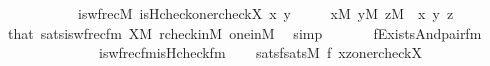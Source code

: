 \begin{isabellebody}
\ \ \ \ \ \ \ \ \ \ \ \ is{\isacharunderscore}{\kern0pt}wfrec{\isacharparenleft}{\kern0pt}{\isacharhash}{\kern0pt}{\isacharhash}{\kern0pt}M{\isacharcomma}{\kern0pt}\ is{\isacharunderscore}{\kern0pt}Hcheck{\isacharparenleft}{\kern0pt}one{\isacharparenright}{\kern0pt}{\isacharcomma}{\kern0pt}rcheck{\isacharparenleft}{\kern0pt}X{\isacharparenright}{\kern0pt}{\isacharcomma}{\kern0pt}\ x{\isacharcomma}{\kern0pt}\ y{\isacharparenright}{\kern0pt}{\isachardoublequoteclose}\isanewline
\ \ \ \ \ {\isachardoublequoteopen}x{\isasymin}M{\isachardoublequoteclose}\ {\isachardoublequoteopen}y{\isasymin}M{\isachardoublequoteclose}\ {\isachardoublequoteopen}z{\isasymin}M{\isachardoublequoteclose}\ \ x\ y\ z\isanewline
\ \ \ \ \isamarkupfalse%
\ \ that\ sats{\isacharunderscore}{\kern0pt}is{\isacharunderscore}{\kern0pt}wfrec{\isacharunderscore}{\kern0pt}fm\ {\isacartoucheopen}X{\isasymin}M{\isacartoucheclose}\ rcheck{\isacharunderscore}{\kern0pt}in{\isacharunderscore}{\kern0pt}M\ one{\isacharunderscore}{\kern0pt}in{\isacharunderscore}{\kern0pt}M\ \isamarkupfalse%
\ simp\isanewline
\ \ \isamarkupfalse%
\isanewline
\ \ \ \ {\isacharquery}{\kern0pt}f{\isacharequal}{\kern0pt}{\isachardoublequoteopen}Exists{\isacharparenleft}{\kern0pt}And{\isacharparenleft}{\kern0pt}pair{\isacharunderscore}{\kern0pt}fm{\isacharparenleft}{\kern0pt}{}{\isacharcomma}{\kern0pt}{}{\isacharcomma}{\kern0pt}{}{\isacharparenright}{\kern0pt}{\isacharcomma}{\kern0pt}\isanewline
\ \ \ \ \ \ \ \ \ \ \ \ \ \ \ is{\isacharunderscore}{\kern0pt}wfrec{\isacharunderscore}{\kern0pt}fm{\isacharparenleft}{\kern0pt}is{\isacharunderscore}{\kern0pt}Hcheck{\isacharunderscore}{\kern0pt}fm{\isacharparenleft}{\kern0pt}{}{\isacharcomma}{\kern0pt}{}{\isacharcomma}{\kern0pt}{}{\isacharcomma}{\kern0pt}{}{\isacharparenright}{\kern0pt}{\isacharcomma}{\kern0pt}{}{\isacharcomma}{\kern0pt}{}{\isacharcomma}{\kern0pt}{}{\isacharparenright}{\kern0pt}{\isacharparenright}{\kern0pt}{\isacharparenright}{\kern0pt}{\isachardoublequoteclose}\isanewline
\ \ \isamarkupfalse%
\ satsf{\isacharcolon}{\kern0pt}{\isachardoublequoteopen}sats{\isacharparenleft}{\kern0pt}M{\isacharcomma}{\kern0pt}\ {\isacharquery}{\kern0pt}f{\isacharcomma}{\kern0pt}\ {\isacharbrackleft}{\kern0pt}x{\isacharcomma}{\kern0pt}z{\isacharcomma}{\kern0pt}one{\isacharcomma}{\kern0pt}rcheck{\isacharparenleft}{\kern0pt}X{\isacharparenright}{\kern0pt}{\isacharbrackright}{\kern0pt}{\isacharparenright}{\kern0pt}\ {\isasymlongleftrightarrow}\isanewline

\end{isabellebody}
